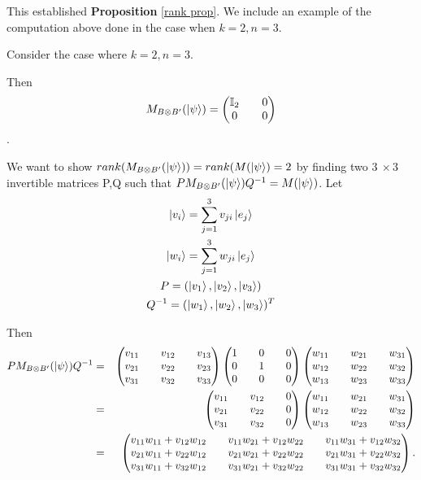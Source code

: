 This established {\bf{Proposition}} \ref{rank prop}. We include an example of the computation above done in the case when $k=2, n=3$.
\begin{example}
Consider the case where $k=2, n=3$.

Then 
$$M_{B \otimes B'}(\ket{\psi})=\begin{pmatrix}
\mathbb{I}_2 && 0 \\
0 && 0
\end{pmatrix}$$.

We want to show $rank(M_{B \otimes B'}(\ket{\psi}))=rank(M(\ket{\psi})=2$ by finding two $3\  \times 3$ invertible matrices P,Q such that $PM_{B \otimes B'}(\ket{\psi})Q^{-1}=M(\ket{\psi})$.
Let
\begin{gather*}
\ket{v_i}=\sum_{j=1}^3 v_{ji}\ket{e_j}\\
\ket{w_i}=\sum_{j=1}^3 w_{ji}\ket{e_j}\\
P=(\ket{v_1}, \ket{v_2}, \ket{v_3})\\
Q^{-1}=(\ket{w_1}, \ket{w_2}, \ket{w_3})^T
\end{gather*}

Then
\begin{eqnarray*}
P M_{B \otimes B'}(\ket{\psi}) Q^{-1}&=&\begin{pmatrix}
v_{11} && v_{12} && v_{13}\\
v_{21} && v_{22} && v_{23}\\
v_{31} && v_{32} && v_{33}
\end{pmatrix}
\begin{pmatrix}
1 && 0 && 0\\
0 && 1 && 0\\
0 && 0 && 0\\
\end{pmatrix}
\begin{pmatrix}
w_{11} && w_{21} && w_{31}\\
w_{12} && w_{22} && w_{32}\\
w_{13} && w_{23} && w_{33}
\end{pmatrix}\\
&=&\begin{pmatrix}
v_{11} && v_{12} && 0\\
v_{21} && v_{22} && 0\\
v_{31} && v_{32} && 0
\end{pmatrix}
\begin{pmatrix}
w_{11} && w_{21} && w_{31}\\
w_{12} && w_{22} && w_{32}\\
w_{13} && w_{23} && w_{33}
\end{pmatrix}\\
&=&\begin{pmatrix}
v_{11}w_{11}+v_{12}w_{12} && v_{11}w_{21}+v_{12}w_{22} && v_{11}w_{31}+v_{12}w_{32}\\
v_{21}w_{11}+v_{22}w_{12} && v_{21}w_{21}+v_{22}w_{22} && v_{21}w_{31}+v_{22}w_{32} \\
v_{31}w_{11}+v_{32}w_{12} && v_{31}w_{21}+v_{32}w_{22} && v_{31}w_{31}+v_{32}w_{32} \\
\end{pmatrix}.
\end{eqnarray*}



\end{example}
